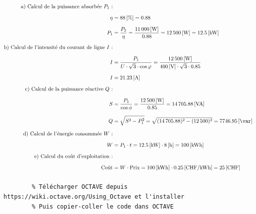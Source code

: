 \documentclass[a4paper,11pt,answers,addpoints]{exam}
\begin{document}
\begin{questions}
\vspace{0.5em}
\begin{solution}
	\begin{align*}
		\text{a) Calcul de la puissance absorbée } P_1 \text{ :} & \\[6pt]
		\eta &= \qty{88}{[\%]} = \qty{0,88}{} \\[6pt]
		P_1 &= \dfrac{P_2}{\eta} = \dfrac{\qty{11000}{[\watt]}}{\qty{0,88}{}} = \qty{12500}{[\watt]} = \qty{12,5}{[\kilo\watt]} \\[6pt]
		\text{b) Calcul de l'intensité du courant de ligne } I \text{ :} & \\[6pt]
		I &= \dfrac{P_1}{U \cdot \sqrt{3} \cdot \cos \varphi} = \dfrac{\qty{12500}{[\watt]}}{\qty{400}{[\volt]} \cdot \sqrt{3} \cdot \qty{0,85}{}} \\[6pt]
		I &= \qty{21,23}{[\ampere]} \\[6pt]
		\text{c) Calcul de la puissance réactive } Q \text{ :} & \\[6pt]
		S &= \dfrac{P_1}{\cos \phi} = \dfrac{\qty{12500}{[\watt]}}{\qty{0,85}{}} = \qty{14705,88}{[\volt\ampere]} \\[6pt]
		Q &= \sqrt{S^2 - P_1^2} = \sqrt{(\qty{14705,88}{})^2 - (\qty{12500}{})^2} = \qty{7746,95}{[\var]} \\[6pt]
		\text{d) Calcul de l'énergie consommée } W \text{ :} & \\[6pt]
		W &= P_1 \cdot t = \qty{12,5}{[\kilo\watt]} \cdot \qty{8}{[\hour]} = \qty{100}{[\kilo\watt\hour]} \\[6pt]
		\text{e) Calcul du coût d'exploitation :} & \\[6pt]
		\text{Coût} &= W \cdot \text{Prix} = \qty{100}{[\kilo\watt\hour]} \cdot \qty{0,25}{[CHF/\kilo\watt\hour]} = \qty{25}{[CHF]} \\[6pt]
	\end{align*}
	\vspace{0.5em}
	\begin{verbatim}
		% Télécharger OCTAVE depuis https://wiki.octave.org/Using_Octave et l'installer
		% Puis copier-coller le code dans OCTAVE
		

\end{verbatim}
\end{solution}
\end{questions}
\end{document}
